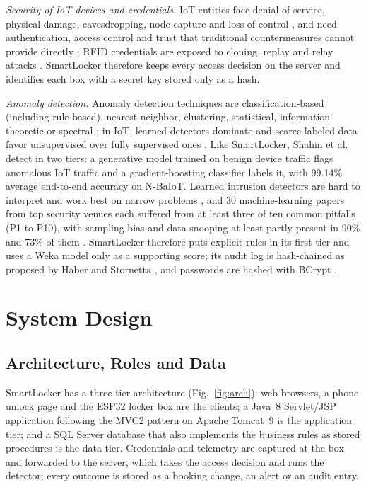 \documentclass[manuscript,screen]{acmart}
\begin{document}
\textit{Security of IoT devices and credentials.} IoT entities face denial of service, physical damage, eavesdropping,
node capture and loss of control \cite{roman2013features}, and need authentication, access control and trust that
traditional countermeasures cannot provide directly \cite{sicari2015security}; RFID credentials are exposed to cloning,
replay and relay attacks \cite{mitrokotsa2010rfid}. SmartLocker therefore keeps every access decision on the server and
identifies each box with a secret key stored only as a hash.

\textit{Anomaly detection.} Anomaly detection techniques are classification-based (including rule-based), nearest-neighbor,
clustering, statistical, information-theoretic or spectral \cite{chandola2009anomaly}; in IoT, learned detectors
dominate and scarce labeled data favor unsupervised over fully supervised ones \cite{demedeiros2023anomaly}. Like
SmartLocker, Shahin et al. \cite{shahin2025twostage} detect in two tiers: a generative model trained on benign device
traffic flags anomalous IoT traffic and a gradient-boosting classifier labels it, with 99.14\% average end-to-end
accuracy on N-BaIoT. Learned intrusion
detectors are hard to interpret and work best on narrow problems \cite{sommer2010outside}, and 30 machine-learning
papers from top security venues each suffered from at least three of ten common pitfalls (P1 to P10), with sampling bias and data
snooping at least partly present in 90\% and 73\% of them \cite{arp2022dos}. SmartLocker therefore puts explicit rules
in its first tier and uses a Weka model \cite{hall2009weka} only as a supporting score; its audit log is hash-chained as
proposed by Haber and Stornetta \cite{haber1991timestamp}, and passwords are hashed with BCrypt \cite{provos1999bcrypt}.

\section{System Design}\label{sec:design}

\subsection{Architecture, Roles and Data}

SmartLocker has a three-tier architecture (Fig.~\ref{fig:arch}): web browsers, a phone unlock page and the ESP32 locker
box are the clients; a Java~8 Servlet/JSP application following the MVC2 pattern on Apache Tomcat~9 is the
application tier; and a SQL Server database that also implements the business rules as stored procedures is the data
tier. Credentials and telemetry are captured at the box and forwarded to the server, which takes the access decision
and runs the detector; every outcome is stored as a booking change, an alert or an audit entry.
\end{document}
